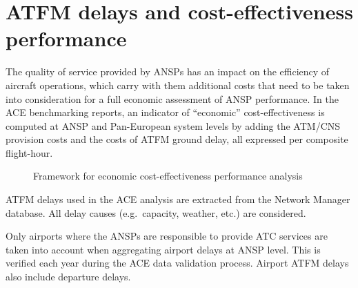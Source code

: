 \documentclass[
  11pt,
  a4paperpaper,
  openany,headsepline=on,footsepline=off,DIV=12,table]{scrbook}
\begin{document}

\chapter{ATFM delays and cost-effectiveness
performance}\label{sec-delay-cef}

The quality of service provided by ANSPs has an impact on the efficiency
of aircraft operations, which carry with them additional costs that need
to be taken into consideration for a full economic assessment of ANSP
performance. In the ACE benchmarking reports, an indicator of
``economic'' cost-effectiveness is computed at ANSP and Pan-European
system levels by adding the ATM/CNS provision costs and the costs of
ATFM ground delay, all expressed per composite flight-hour.

\begin{figure}


\caption{\label{fig-framework-economic}Framework for economic
cost-effectiveness performance analysis}

\end{figure}%

ATFM delays used in the ACE analysis are extracted from the Network
Manager database. All delay causes (e.g.~capacity, weather, etc.) are
considered.

Only airports where the ANSPs are responsible to provide ATC services
are taken into account when aggregating airport delays at ANSP level.
This is verified each year during the ACE data validation process.
Airport ATFM delays also include departure delays.
\end{document}
